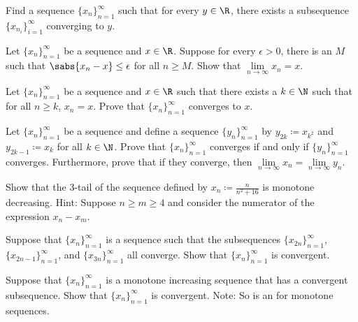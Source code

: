 \begin{exercise}[Tricky]
Find a sequence $\{ x_n \}_{n=1}^\infty$ such that for every $y \in \R$, there exists a
subsequence $\{ x_{n_i} \}_{i=1}^\infty$ converging to $y$.
\end{exercise}

\begin{exercise}[Easy]
Let $\{ x_n \}_{n=1}^\infty$ be a sequence and $x \in \R$.
Suppose for every $\epsilon > 0$, there is an $M$ such that
$\sabs{x_n-x} \leq \epsilon$ for all $n \geq M$.
Show that $\lim\limits_{n\to\infty} x_n = x$.
\end{exercise}

\begin{exercise}[Easy]
Let $\{ x_n \}_{n=1}^\infty$ be a sequence and $x \in \R$ such that
there exists a $k \in \N$ such that for all $n \geq k$,
$x_n = x$.  Prove that $\{ x_n \}_{n=1}^\infty$ converges to $x$.
\end{exercise}

\begin{exercise}
Let $\{ x_n \}_{n=1}^\infty$ be a sequence and
define a sequence $\{ y_n \}_{n=1}^\infty$ by
$y_{2k} \coloneqq x_{k^2}$ and $y_{2k-1} \coloneqq x_k$ for all $k \in \N$.
Prove that $\{ x_n \}_{n=1}^\infty$ converges if and only if
$\{ y_n \}_{n=1}^\infty$ converges.
Furthermore, prove that if they converge, then
$\lim\limits_{n\to\infty} x_n = \lim\limits_{n\to\infty} y_n$.
\end{exercise}

\begin{exercise}
Show that the 3-tail of the sequence defined by $x_n \coloneqq \frac{n}{n^2+16}$ is
monotone decreasing.  Hint: Suppose $n \geq m \geq 4$ and consider the 
numerator of the expression $x_n-x_m$.
\end{exercise}

\begin{exercise}
Suppose that $\{ x_n \}_{n=1}^\infty$ is a sequence such that
the subsequences $\{ x_{2n} \}_{n=1}^\infty$, $\{ x_{2n-1} \}_{n=1}^\infty$, and
$\{ x_{3n} \}_{n=1}^\infty$ all converge.  Show that $\{ x_n \}_{n=1}^\infty$ is convergent.
\end{exercise}

\begin{exercise}
Suppose that $\{ x_n \}_{n=1}^\infty$ is a monotone increasing sequence that
has a convergent subsequence.
Show that $\{ x_n \}_{n=1}^\infty$ is convergent.
Note: So  is an  for monotone sequences.
\end{exercise}

